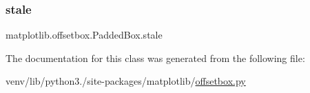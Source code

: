 \mbox{\label{classmatplotlib_1_1offsetbox_1_1PaddedBox_a9eed701f8146289a346cea52ea8818dd}} 
\subsubsection{\texorpdfstring{stale}{stale}}
{\footnotesize\ttfamily matplotlib.\+offsetbox.\+Padded\+Box.\+stale}



The documentation for this class was generated from the following file\+:\begin{DoxyCompactItemize}
\item 
venv/lib/python3./site-\/packages/matplotlib/\hyperlink{offsetbox_8py}{offsetbox.\+py}\end{DoxyCompactItemize}
